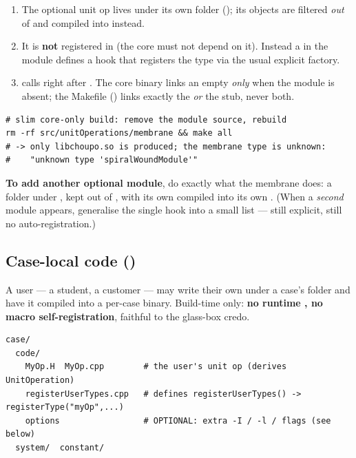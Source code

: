 \documentclass[11pt,a4paper]{article}
\begin{document}
\begin{enumerate}[leftmargin=1.6em]
  \item The optional unit op lives under its own folder
    (); its objects are filtered
    \emph{out} of  and compiled into
     instead.
  \item It is \textbf{not} registered in
     (the core must not depend on
    it).  Instead a  in the module defines a
     hook that registers the type via the usual
    explicit factory.
  \item {} calls  right
    after .  The core binary links an empty
     \emph{only} when the module is absent;
    the Makefile () links exactly the 
    \emph{or} the stub, never both.
\end{enumerate}

\begin{lstlisting}
# slim core-only build: remove the module source, rebuild
rm -rf src/unitOperations/membrane && make all
# -> only libchoupo.so is produced; the membrane type is unknown:
#    "unknown type 'spiralWoundModule'"
\end{lstlisting}

\textbf{To add another optional module}, do exactly what the membrane
does: a folder under , kept out of ,
with its own  compiled into its own .
(When a \emph{second} module appears, generalise the single
 hook into a small list --- still explicit, still
no auto-registration.)

\subsection{Case-local code ()}
\label{sec:case-code}

A user --- a student, a customer --- may write their own \cpp{} under a
case's  folder and have it compiled into a per-case binary.
Build-time only: \textbf{no runtime , no macro
self-registration}, faithful to the glass-box credo.

\begin{lstlisting}
case/
  code/
    MyOp.H  MyOp.cpp        # the user's unit op (derives UnitOperation)
    registerUserTypes.cpp   # defines registerUserTypes() -> registerType("myOp",...)
    options                 # OPTIONAL: extra -I / -l / flags (see below)
  system/  constant/
\end{lstlisting}
\end{document}
